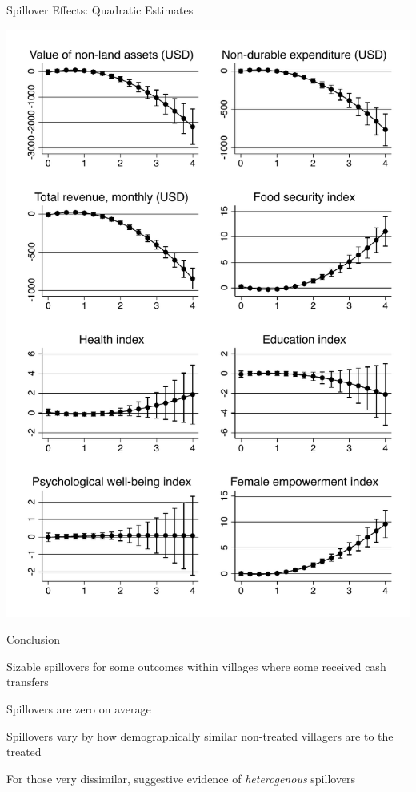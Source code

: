 \documentclass[14pt, aspectratio=169]{beamer}
\newenvironment{wideitemize}{\itemize\addtolength{\itemsep}{10pt}}{\enditemize}
\let\OLDitemize\itemize
\renewcommand\itemize{\OLDitemize\addtolength{\itemsep}{10pt}}
\begin{document}
\begin{frame}{Spillover Effects: Quadratic Estimates}
\begin{minipage}{.48\linewidth}
\end{minipage}
\hfill
\begin{minipage}{.48\linewidth}
    \includegraphics[height=0.66\textheight, trim={0 0 0 10cm}, clip]{../Figs/indices_ppp_margins.pdf}

\end{minipage}


\end{frame}

\begin{frame}{Conclusion}
\begin{wideitemize}
\item Sizable spillovers for some outcomes within villages where some received cash transfers
\item Spillovers are zero on average
\item Spillovers vary by how demographically similar non-treated villagers are to the treated
\item For those very dissimilar, suggestive evidence of \textit{heterogenous} spillovers
\end{wideitemize}
\end{frame}
\end{document}
